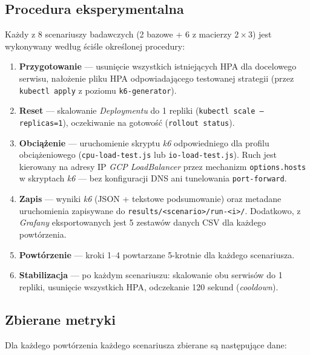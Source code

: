 \subsection{Procedura eksperymentalna}

Każdy z 8 scenariuszy badawczych (2 bazowe + 6 z macierzy $2 \times 3$) jest wykonywany według ściśle określonej procedury:

\begin{enumerate}
  \item \textbf{Przygotowanie} — usunięcie wszystkich istniejących HPA dla docelowego serwisu, nałożenie pliku HPA odpowiadającego testowanej strategii (przez \texttt{kubectl apply} z poziomu \texttt{k6-generator}).

  \item \textbf{Reset} — skalowanie \textit{Deploymentu} do 1 repliki (\texttt{kubectl scale --replicas=1}), oczekiwanie na gotowość (\texttt{rollout status}).

  \item \textbf{Obciążenie} — uruchomienie skryptu \textit{k6} odpowiedniego dla profilu obciążeniowego (\texttt{cpu-load-test.js} lub \texttt{io-load-test.js}). Ruch jest kierowany na adresy IP \textit{GCP LoadBalancer} przez mechanizm \texttt{options.hosts} w skryptach \textit{k6} — bez konfiguracji DNS ani tunelowania \texttt{port-forward}.

  \item \textbf{Zapis} — wyniki \textit{k6} (JSON + tekstowe podsumowanie) oraz metadane uruchomienia zapisywane do \texttt{results/<scenario>/run-<i>/}. Dodatkowo, z \textit{Grafany} eksportowanych jest 5 zestawów danych CSV dla każdego powtórzenia.

  \item \textbf{Powtórzenie} — kroki 1--4 powtarzane 5-krotnie dla każdego scenariusza.

  \item \textbf{Stabilizacja} — po każdym scenariuszu: skalowanie obu serwisów do 1 repliki, usunięcie wszystkich HPA, odczekanie 120 sekund (\textit{cooldown}).
\end{enumerate}

\subsection{Zbierane metryki}

Dla każdego powtórzenia każdego scenariusza zbierane są następujące dane:


